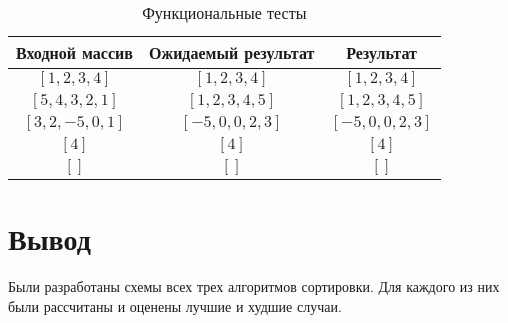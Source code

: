 \begin{table}[h]
	\begin{center}
		\caption{\label{tbl:functional_test} Функциональные тесты}
		\begin{tabular}{|c|c|c|}
			\hline
			Входной массив & Ожидаемый результат & Результат \\ 
			\hline
			$[1,2,3,4]$ & $[1,2,3,4]$  & $[1,2,3,4]$\\
			$[5,4,3,2,1]$  & $[1,2,3,4,5]$ & $[1,2,3,4,5]$\\
			$[3,2,-5,0,1]$  & $[-5,0,0,2,3]$  & $[-5,0,0,2,3]$\\
			$[4]$  & $[4]$  & $[4]$\\
			$[]$  & $[]$  & $[]$\\
			\hline
		\end{tabular}
	\end{center}
\end{table}


\section*{Вывод}

Были разработаны схемы всех трех алгоритмов сортировки. Для каждого из них были рассчитаны и оценены лучшие и худшие случаи.
